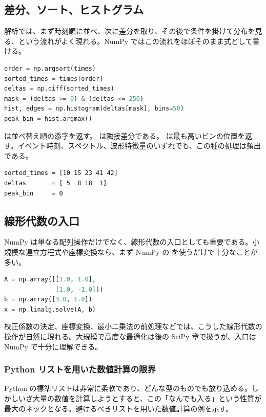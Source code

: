 \subsection{差分、ソート、ヒストグラム}

解析では、まず時刻順に並べ、次に差分を取り、その後で条件を掛けて分布を見る、という流れがよく現れる。NumPy ではこの流れをほぼそのまま式として書ける。

\begin{lstlisting}[language=Python]
order = np.argsort(times)
sorted_times = times[order]
deltas = np.diff(sorted_times)
mask = (deltas >= 0) & (deltas <= 250)
hist, edges = np.histogram(deltas[mask], bins=50)
peak_bin = hist.argmax()
\end{lstlisting}

 は並べ替え順の添字を返す。 は隣接差分である。 は最も高いビンの位置を返す。イベント時刻、スペクトル、波形特徴量のいずれでも、この種の処理は頻出である。

\begin{lstlisting}[numbers=none, xleftmargin=2\zw]
sorted_times = [10 15 23 41 42]
deltas       = [ 5  8 18  1]
peak_bin     = 0
\end{lstlisting}

\subsection{線形代数の入口}

NumPy は単なる配列操作だけでなく、線形代数の入口としても重要である。小規模な連立方程式や座標変換なら、まず NumPy の  を使うだけで十分なことが多い。

\begin{lstlisting}[language=Python]
A = np.array([[1.0, 1.0],
              [1.0, -1.0]])
b = np.array([3.0, 1.0])
x = np.linalg.solve(A, b)
\end{lstlisting}

校正係数の決定、座標変換、最小二乗法の前処理などでは、こうした線形代数の操作が自然に現れる。大規模で高度な最適化は後の SciPy 章で扱うが、入口は NumPy で十分に理解できる。

\subsubsection{Python リストを用いた数値計算の限界}

Python の標準リストは非常に柔軟であり、どんな型のものでも放り込める。しかしいざ大量の数値を計算しようとすると、この「なんでも入る」という性質が最大のネックとなる。避けるべきリストを用いた数値計算の例を示す。

